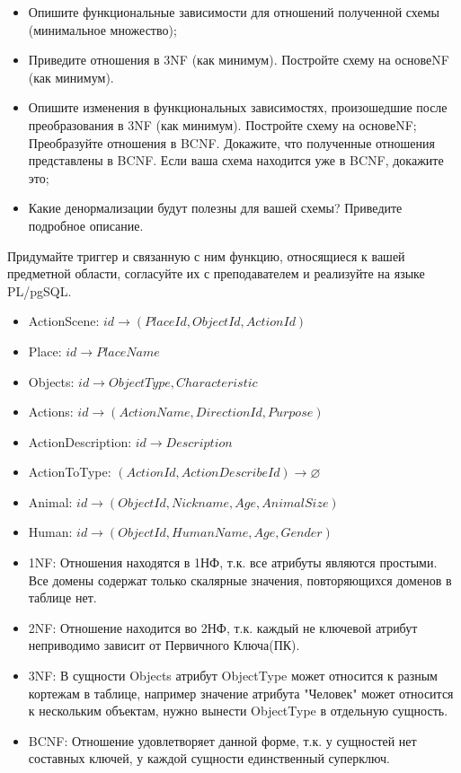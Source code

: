 \begin{itemize}

\item Опишите функциональные зависимости для отношений полученной схемы (минимальное множество);

\item Приведите отношения в 3NF (как минимум). Постройте схему на основеNF (как минимум). 

\item Опишите изменения в функциональных зависимостях, произошедшие после преобразования в 3NF (как минимум). Постройте схему на основеNF;
Преобразуйте отношения в BCNF. Докажите, что полученные отношения представлены в BCNF. Если ваша схема находится уже в BCNF, докажите это;

\item Какие денормализации будут полезны для вашей схемы? Приведите подробное описание.

\end{itemize}
Придумайте триггер и связанную с ним функцию, относящиеся к вашей предметной области, согласуйте их с преподавателем и реализуйте на языке PL/pgSQL.
\newpage
{}

\begin{itemize}
    \item ActionScene: \(id \rightarrow (PlaceId, ObjectId, ActionId)\)
    \item Place: \(id \rightarrow PlaceName\)
    \item Objects: \(id \rightarrow ObjectType, Characteristic\)
    \item Actions: \(id \rightarrow (ActionName, DirectionId, Purpose)\)
    \item ActionDescription: \(id \rightarrow Description\)
    \item ActionToType: \((ActionId, ActionDescribeId) \rightarrow 
 \varnothing\)
    \item Animal: \(id \rightarrow (ObjectId, Nickname, Age, AnimalSize)\)
    \item Human: \(id \rightarrow (ObjectId, HumanName, Age, Gender)\)
\end{itemize}
\begin{itemize}
    \item 1NF: Отношения находятся в 1НФ, т.к. все атрибуты являются простыми. Все домены содержат только скалярные значения, повторяющихся доменов в таблице нет.
    \item 2NF: Отношение находится во 2НФ, т.к. каждый не ключевой атрибут неприводимо зависит от Первичного Ключа(ПК).
    \item 3NF: В сущности Objects атрибут ObjectType может относится к разным кортежам в таблице, например значение атрибута "Человек" может относится к нескольким объектам, нужно вынести ObjectType в отдельную сущность.
    \item BCNF: Отношение удовлетворяет данной форме, т.к. у сущностей нет составных ключей, у каждой сущности единственный суперключ.
\end{itemize}


